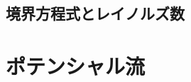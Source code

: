\documentclass[uplatex,dvipdfmx,a4j,11pt]{jsreport}
\newcommand{\e}{\mathbf{e}} %
\newcommand{\diff}{\mathrm{d}} %
\numberwithin{equation}{chapter}
\begin{document}




\subsection{境界方程式とレイノルズ数}

\section{ポテンシャル流}
\end{document}
